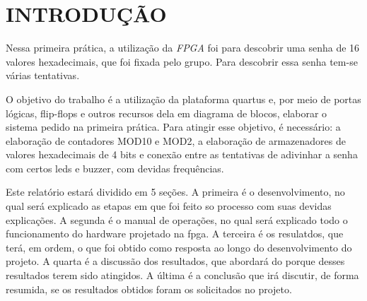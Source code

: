 \chapter{INTRODUÇÃO} \label{cap_1_Introducao}

Nessa primeira prática, a utilização da \emph{FPGA} foi para descobrir uma senha de 16 valores hexadecimais, que foi fixada pelo grupo. Para descobrir essa senha tem-se várias tentativas.


O objetivo do trabalho é a utilização da plataforma quartus e, por meio de portas lógicas, flip-flops e outros recursos dela em diagrama de blocos, elaborar o sistema pedido na primeira prática. Para atingir esse objetivo, é necessário: a elaboração de contadores MOD10 e MOD2, a elaboração de armazenadores de valores hexadecimais de 4 bits e conexão entre as tentativas de adivinhar a senha com certos leds e buzzer, com devidas frequências.


Este relatório estará dividido em 5 seções. A primeira é o desenvolvimento, no qual será explicado as etapas em que foi feito so processo com suas devidas explicações. A segunda é o manual de operações, no qual será explicado todo o funcionamento do hardware projetado na fpga. A terceira é os resulatdos, que terá, em ordem, o que foi obtido como resposta ao longo do desenvolvimento do projeto. A quarta é a discussão dos resultados, que abordará do porque desses resultados terem sido atingidos. A última é a conclusão que irá discutir, de forma resumida, se os resultados obtidos foram os solicitados no projeto.  


